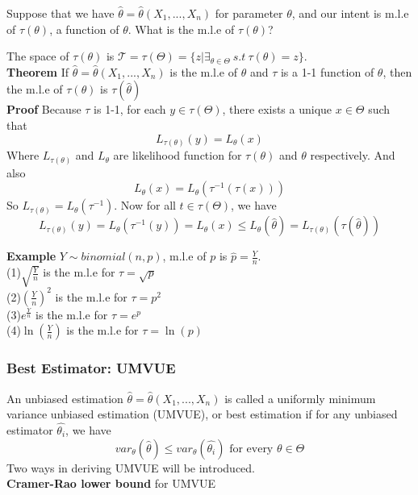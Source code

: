 \documentclass[a4paper,12pt]{article}
\begin{document}
Suppose that we have $\hat{\theta} = \hat{\theta}(X_1, ..., X_n)$ for parameter $\theta$, and our intent is m.l.e of $\tau(\theta)$, a function of $\theta$. What is the m.l.e of $\tau(\theta)$?

The space of $\tau(\theta)$ is $\mathcal{T} = \tau(\Theta) = \{ z | \exists_{\theta\in\Theta}\ s.t\ \tau(\theta) = z\}$.\\

\textbf{Theorem} If $\hat{\theta} = \hat{\theta}(X_1, ..., X_n)$ is the m.l.e of $\theta$ and $\tau$ is a 1-1 function of $\theta$, then the m.l.e of $\tau(\theta)$ is $\tau(\hat{\theta})$\\

\textbf{Proof} Because $\tau$ is 1-1, for each $y\in\tau(\Theta)$, there exists a unique $x\in\Theta$ such that
$$L_{\tau(\theta)}(y) = L_{\theta}(x)$$
Where $L_{\tau(\theta)}$ and $L_{\theta}$ are likelihood function for $\tau(\theta)$ and $\theta$ respectively. And also
$$L_{\theta}(x) = L_{\theta}(\tau^{-1}(\tau(x)))$$
So $L_{\tau(\theta)} =  L_{\theta}(\tau^{-1})$. Now for all $t\in\tau(\Theta)$, we have
$$L_{\tau(\theta)}(y) =  L_{\theta}(\tau^{-1}(y)) = L_{\theta}(x) \leq L_{\theta}(\hat{\theta}) = L_{\tau(\theta)}(\tau(\hat{\theta}))$$

\textbf{Example} $Y \sim binomial(n, p)$, m.l.e of $p$ is $\hat{p} = \frac{Y}{n}$.\\
(1)$\sqrt{\frac{Y}{n}}$ is the m.l.e for $\tau = \sqrt{p}$\\
(2)$(\frac{Y}{n})^2$ is the m.l.e for $\tau = p^2$\\
(3)$e^{\frac{Y}{n}}$ is the m.l.e for $\tau = e^p$\\
(4)$\ln(\frac{Y}{n})$ is the m.l.e for $\tau = \ln(p)$\\

\subsubsection{Best Estimator: UMVUE}

An unbiased estimation $\hat{\theta} = \hat{\theta}( X_1, ..., X_n )$ is called a uniformly minimum variance unbiased estimation (UMVUE), or best estimation if for any unbiased estimator $\hat{\theta_i}$, we have
$$var_\theta(\hat{\theta}) \leq var_\theta(\hat{\theta_i}) \text{ for every } \theta \in \Theta$$
Two ways in deriving UMVUE will be introduced.\\

\textbf{Cramer-Rao lower bound } for UMVUE\\
\end{document}

